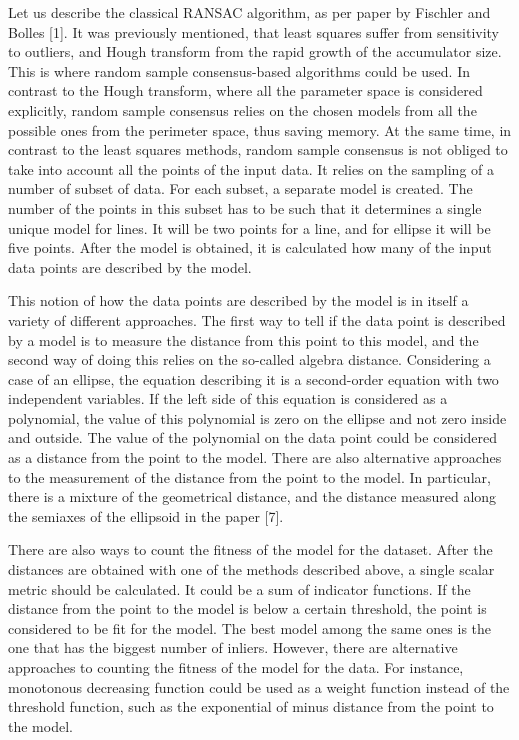 Let us describe the classical RANSAC algorithm, as per paper by Fischler and Bolles [1]. It was previously mentioned, that least squares suffer from sensitivity to outliers, and Hough transform from the rapid growth of the accumulator size. This is where random sample consensus-based algorithms could be used. In contrast to the Hough transform, where all the parameter space is considered explicitly, random sample consensus relies on the chosen models from all the possible ones from the perimeter space, thus saving memory. At the same time, in contrast to the least squares methods, random sample consensus is not obliged to take into account all the points of the input data. It relies on the sampling of a number of subset of data. For each subset, a separate model is created. The number of the points in this subset has to be such that it determines a single unique model for lines. It will be two points for a line, and for ellipse it will be five points. After the model is obtained, it is calculated how many of the input data points are described by the model.

This notion of how the data points are described by the model is in itself a variety of different approaches. The first way to tell if the data point is described by a model is to measure the distance from this point to this model, and the second way of doing this relies on the so-called algebra distance. Considering a case of an ellipse, the equation describing it is a second-order equation with two independent variables. If the left side of this equation is considered as a polynomial, the value of this polynomial is zero on the ellipse and not zero inside and outside. The value of the polynomial on the data point could be considered as a distance from the point to the model. There are also alternative approaches to the measurement of the distance from the point to the model. In particular, there is a mixture of the geometrical distance, and the distance measured along the semiaxes of the ellipsoid in the paper [7].

There are also ways to count the fitness of the model for the dataset. After the distances are obtained with one of the methods described above, a single scalar metric should be calculated. It could be a sum of indicator functions. If the distance from the point to the model is below a certain threshold, the point is considered to be fit for the model. The best model among the same ones is the one that has the biggest number of inliers. However, there are alternative approaches to counting the fitness of the model for the data. For instance, monotonous decreasing function could be used as a weight function instead of the threshold function, such as the exponential of minus distance from the point to the model.


